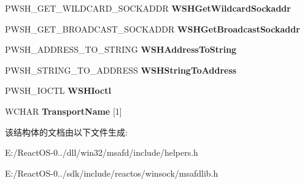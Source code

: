 \begin{DoxyCompactItemize}
\mbox{\label{struct___h_e_l_p_e_r___d_a_t_a_af16f871d371ba313d3aa418512e0246d}} 
P\+W\+S\+H\+\_\+\+G\+E\+T\+\_\+\+W\+I\+L\+D\+C\+A\+R\+D\+\_\+\+S\+O\+C\+K\+A\+D\+DR {\bfseries W\+S\+H\+Get\+Wildcard\+Sockaddr}
\item 
\mbox{\label{struct___h_e_l_p_e_r___d_a_t_a_a946f9281ed23eb57469fb0728d0f920a}} 
P\+W\+S\+H\+\_\+\+G\+E\+T\+\_\+\+B\+R\+O\+A\+D\+C\+A\+S\+T\+\_\+\+S\+O\+C\+K\+A\+D\+DR {\bfseries W\+S\+H\+Get\+Broadcast\+Sockaddr}
\item 
\mbox{\label{struct___h_e_l_p_e_r___d_a_t_a_a76b7484f5ac06b4c863b9e9c29928b3d}} 
P\+W\+S\+H\+\_\+\+A\+D\+D\+R\+E\+S\+S\+\_\+\+T\+O\+\_\+\+S\+T\+R\+I\+NG {\bfseries W\+S\+H\+Address\+To\+String}
\item 
\mbox{\label{struct___h_e_l_p_e_r___d_a_t_a_a76329cadf8ee18bb73241965c4a426ba}} 
P\+W\+S\+H\+\_\+\+S\+T\+R\+I\+N\+G\+\_\+\+T\+O\+\_\+\+A\+D\+D\+R\+E\+SS {\bfseries W\+S\+H\+String\+To\+Address}
\item 
\mbox{\label{struct___h_e_l_p_e_r___d_a_t_a_a7af5bdda22e7b11a46f9c57a034ce16e}} 
P\+W\+S\+H\+\_\+\+I\+O\+C\+TL {\bfseries W\+S\+H\+Ioctl}
\item 
\mbox{\label{struct___h_e_l_p_e_r___d_a_t_a_acebd23319f6d2be7a6f9c94413bd2d6c}} 
W\+C\+H\+AR {\bfseries Transport\+Name} \mbox{[}1\mbox{]}
\end{DoxyCompactItemize}


该结构体的文档由以下文件生成\+:\begin{DoxyCompactItemize}
\item 
E\+:/\+React\+O\+S-\/0../dll/win32/msafd/include/helpers.\+h\item 
E\+:/\+React\+O\+S-\/0../sdk/include/reactos/winsock/msafdlib.\+h\end{DoxyCompactItemize}
